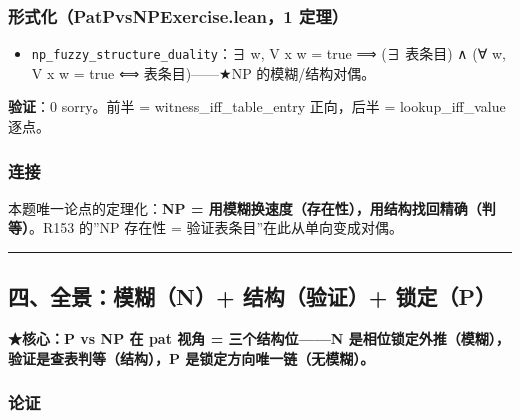 \documentclass[
]{article}
\providecommand{\tightlist}{%
  \setlength{\itemsep}{0pt}\setlength{\parskip}{0pt}}
\begin{document}
\subsubsection{形式化（PatPvsNPExercise.lean，1
定理）}\label{ux5f62ux5f0fux5316patpvsnpexercise.lean1-ux5b9aux7406-2}

\begin{itemize}
\tightlist
\item
  \texttt{np\_fuzzy\_structure\_duality}：∃ w, V x w = true ⟹ (∃ 表条目)
  ∧ (∀ w, V x w = true ⟺ 表条目)------★NP 的模糊/结构对偶。
\end{itemize}

\textbf{验证}：0 sorry。前半 = witness\_iff\_table\_entry 正向，后半 =
lookup\_iff\_value 逐点。

\subsubsection{连接}\label{ux8fdeux63a5-2}

本题唯一论点的定理化：\textbf{NP =
用模糊换速度（存在性），用结构找回精确（判等）}。R153 的''NP 存在性 =
验证表条目''在此从单向变成对偶。

\begin{center}\rule{0.5\linewidth}{0.5pt}\end{center}

\subsection{四、全景：模糊（N）+ 结构（验证）+
锁定（P）}\label{ux56dbux5168ux666fux6a21ux7ccan-ux7ed3ux6784ux9a8cux8bc1-ux9501ux5b9ap}

\textbf{★核心：P vs NP 在 pat 视角 = 三个结构位------N
是相位锁定外推（模糊），验证是查表判等（结构），P
是锁定方向唯一链（无模糊）。}

\subsubsection{论证}\label{ux8bbaux8bc1-3}
\end{document}
